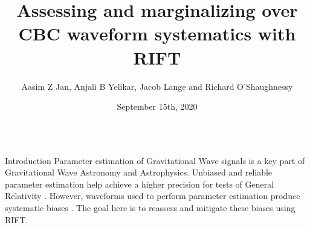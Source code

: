 \documentclass[serif]{beamer}
\title{
%
  Assessing and marginalizing over CBC waveform systematics with RIFT
%
}
\author{
%
Aasim Z Jan, Anjali B Yelikar, Jacob Lange and Richard O'Shaughnessy                      %
%
}
\institute{}
\date{September 15th, 2020}
\begin{document}
\begin{frame}{}

\begin{columns}

\begin{column}[T]{.3\textwidth}

\begin{block}{Introduction}
 Parameter estimation of Gravitational Wave signals is a key part of Gravitational Wave Astronomy and Astrophysics. Unbiased and reliable parameter estimation help achieve a higher precision for tests of General Relativity \cite{Shaik:2019dym}. However, waveforms used to perform parameter estimation produce systematic biases \cite{Veitch:2014wba}. The goal here is to reassess and mitigate these biases using RIFT. %







\end{block}

\vspace{1em}


\end{column}
\end{columns}
\end{frame}
\end{document}
